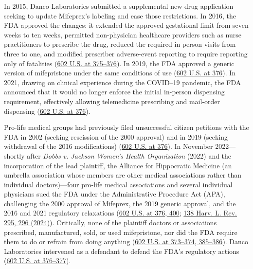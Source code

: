 \documentclass[12pt]{article}
\begin{document}
In 2015, Danco Laboratories submitted a supplemental new drug application seeking to update Mifeprex's labeling and ease those restrictions. In 2016, the FDA approved the changes: it extended the approved gestational limit from seven weeks to ten weeks, permitted non-physician healthcare providers such as nurse practitioners to prescribe the drug, reduced the required in-person visits from three to one, and modified prescriber adverse-event reporting to require reporting only of fatalities (\href{https://www.supremecourt.gov/opinions/23pdf/602us1r35_bqmd.pdf}{602 U.S. at 375--376}). In 2019, the FDA approved a generic version of mifepristone under the same conditions of use (\href{https://www.supremecourt.gov/opinions/23pdf/602us1r35_bqmd.pdf}{602 U.S. at 376}). In 2021, drawing on clinical experience during the COVID--19 pandemic, the FDA announced that it would no longer enforce the initial in-person dispensing requirement, effectively allowing telemedicine prescribing and mail-order dispensing (\href{https://www.supremecourt.gov/opinions/23pdf/602us1r35_bqmd.pdf}{602 U.S. at 376}).

Pro-life medical groups had previously filed unsuccessful citizen petitions with the FDA in 2002 (seeking rescission of the 2000 approval) and in 2019 (seeking withdrawal of the 2016 modifications) (\href{https://www.supremecourt.gov/opinions/23pdf/602us1r35_bqmd.pdf}{602 U.S. at 376}). In November 2022---shortly after \textit{Dobbs v. Jackson Women's Health Organization} (2022) and the incorporation of the lead plaintiff, the Alliance for Hippocratic Medicine (an umbrella association whose members are other medical associations rather than individual doctors)---four pro-life medical associations and several individual physicians sued the FDA under the Administrative Procedure Act (APA), challenging the 2000 approval of Mifeprex, the 2019 generic approval, and the 2016 and 2021 regulatory relaxations (\href{https://www.supremecourt.gov/opinions/23pdf/602us1r35_bqmd.pdf}{602 U.S. at 376, 400}; \href{https://harvardlawreview.org/print/vol-138/fda-v-alliance-for-hippocratic-medicine/}{138 Harv. L. Rev. 295, 296 (2024)}). Critically, none of the plaintiff doctors or associations prescribed, manufactured, sold, or used mifepristone, nor did the FDA require them to do or refrain from doing anything (\href{https://www.supremecourt.gov/opinions/23pdf/602us1r35_bqmd.pdf}{602 U.S. at 373--374, 385--386}). Danco Laboratories intervened as a defendant to defend the FDA's regulatory actions (\href{https://www.supremecourt.gov/opinions/23pdf/602us1r35_bqmd.pdf}{602 U.S. at 376--377}).
\end{document}
